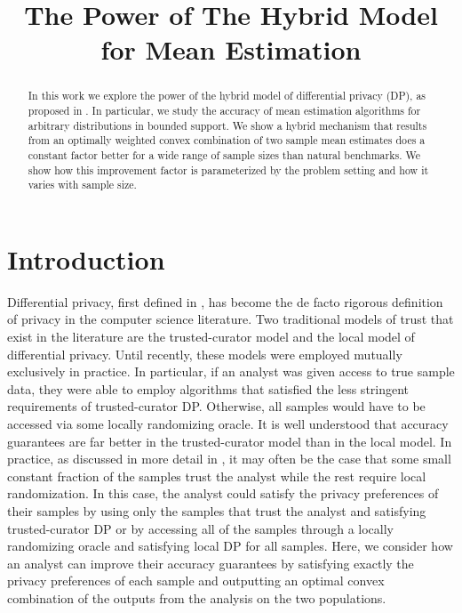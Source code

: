 \documentclass{article}
\title{The Power of The Hybrid Model for Mean Estimation}
\theoremstyle{plain}
\begin{document}
\maketitle

\begin{abstract}
In this work we explore the power of the hybrid model of differential privacy (DP), as proposed in \cite{blender}. In particular, we study the accuracy of mean estimation algorithms for arbitrary distributions in bounded support. We show a hybrid mechanism that results from an optimally weighted convex combination of two sample mean estimates does a constant factor better for a wide range of sample sizes than natural benchmarks. We show how this improvement factor is parameterized by the problem setting and how it varies with sample size. 
\end{abstract}

\section{Introduction}

Differential privacy, first defined in \cite{dmns06}, has become the de facto rigorous definition of privacy in the computer science literature. Two traditional models of trust that exist in the literature are the trusted-curator model and the local model of differential privacy. Until recently, these models were employed mutually exclusively in practice. In particular, if an analyst was given access to true sample data, they were able to employ algorithms that satisfied the less stringent requirements of trusted-curator DP. Otherwise, all samples would have to be accessed via some locally randomizing oracle. It is well understood that accuracy guarantees are far better in the trusted-curator model than in the local model. In practice, as discussed in more detail in \cite{blender}, it may often be the case that some small constant fraction of the samples trust the analyst while the rest require local randomization. In this case, the analyst could satisfy the privacy preferences of their samples by using only the samples that trust the analyst and satisfying trusted-curator DP or by accessing all of the samples through a locally randomizing oracle and satisfying local DP for all samples. Here, we consider how an analyst can improve their accuracy guarantees by satisfying exactly the privacy preferences of each sample and outputting an optimal convex combination of the outputs from the analysis on the two populations. 
\end{document}
